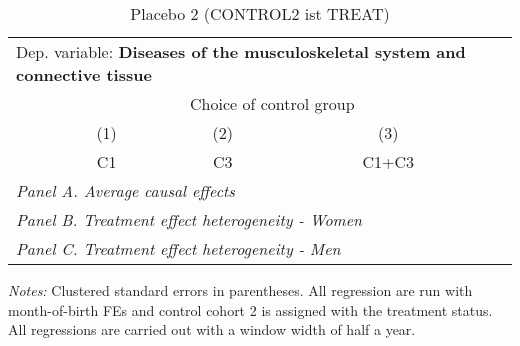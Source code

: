  \begin{table}[H] \centering \begin{threeparttable} \caption{Placebo 2 (CONTROL2 ist TREAT) } {\def\sym#1{\ifmmode^{#1}\else\(^{#1}\)\fi} \begin{tabular}{l*{4}{c}} \toprule \multicolumn{4}{l}{Dep. variable: \textbf{Diseases of the musculoskeletal system and connective tissue}} \\ & \multicolumn{3}{c}{Choice of control group} \\ \cmidrule(lr){2-4}
            &\multicolumn{1}{c}{(1)}&\multicolumn{1}{c}{(2)}&\multicolumn{1}{c}{(3)}\\
            &\multicolumn{1}{c}{C1}&\multicolumn{1}{c}{C3}&\multicolumn{1}{c}{C1+C3}\\
\midrule
 \multicolumn{4}{l}{\emph{Panel A. Average causal effects}} \\      \midrule\multicolumn{4}{l}{\emph{Panel B. Treatment effect heterogeneity - Women}} \\      \midrule\multicolumn{4}{l}{\emph{Panel C. Treatment effect heterogeneity - Men}} \\      
\bottomrule \end{tabular} } \begin{tablenotes} \item \scriptsize \emph{Notes:} Clustered standard errors in parentheses. All regression are run with month-of-birth FEs and control cohort 2 is assigned with the treatment status. All regressions are carried out with a window width of half a year. \end{tablenotes} \end{threeparttable} \end{table} 
